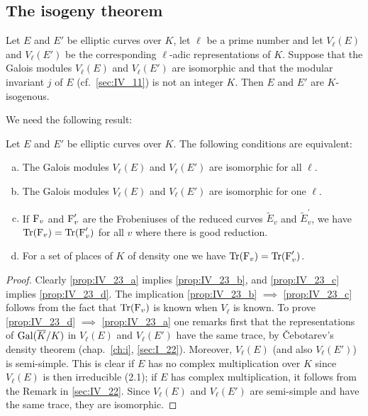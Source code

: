 \subsection{The isogeny theorem}
\label{sec:IV_23}

\begin{thm}
	Let $E$ and $E'$ be elliptic curves over $K$, let $\ell$ be a prime
	number and let $V_\ell(E)$ and $V_\ell(E')$ be the corresponding
	$\ell$-adic representations of $K$. Suppose that the Galois modules
	$V_\ell(E)$ and $V_\ell(E')$ are isomorphic and that the modular
	invariant $j$ of $E$ (cf.~\ref{sec:IV_11}) is not an integer $K$. Then
	$E$ and $E'$ are $K$-isogenous.
\end{thm}

We need the following result:
\dpage
\begin{prop}
	Let $E$ and $E'$ be elliptic curves over $K$. The following conditions
	are equivalent:
	\begin{enumerate}[(a)]
		\item\label{prop:IV_23_a}
			The Galois modules $V_\ell(E)$ and $V_\ell(E')$ are
			isomorphic for all $\ell$.
		\item\label{prop:IV_23_b}
			The Galois modules $V_\ell(E)$ and $V_\ell(E')$ are
			isomorphic for one $\ell$.
		\item\label{prop:IV_23_c}
			If $\operatorname{F}_v$ and $\operatorname{F}^\prime_v$ are the Frobeniuses of
			the reduced curves $\widetilde E_v$ and
			$\widetilde{E}^\prime_v$, we have $\operatorname{Tr}(\operatorname{F}_v) =
			\operatorname{Tr}(\operatorname{F}^\prime_v)$ for all $v$ where there is good
			reduction.
		\item\label{prop:IV_23_d}
			For a set of places of $K$ of density one we have
			$\operatorname{Tr}(\operatorname{F}_v) = \operatorname{Tr}(\operatorname{F}^\prime_v)$.
	\end{enumerate}
\end{prop}
\begin{proof}
	Clearly \ref{prop:IV_23_a} implies \ref{prop:IV_23_b}, and
	\ref{prop:IV_23_c} implies \ref{prop:IV_23_d}. The implication
	\ref{prop:IV_23_b} $\implies$ \ref{prop:IV_23_c} follows from the fact
	that $\operatorname{Tr}(\operatorname{F}_v)$ is known when $V_\ell$ is known. To prove
	\ref{prop:IV_23_d} $\implies$ \ref{prop:IV_23_a} one remarks first that
	the representations of $\operatorname{Gal}(\overline{K}/K)$ in $V_\ell(E)$ and
	$V_\ell(E')$ have the same trace, by \v Cebotarev's density theorem
	(chap.~\ref{ch:i}, \ref{sec:I_22}). Moreover, $V_\ell(E)$ (and also
	$V_\ell(E')$) is semi-simple. This is clear if $E$ has no complex
	multiplication over $K$ since $V_\ell(E)$ is then irreducible (2.1); if
	$E$ has complex multiplication, it follows from the Remark in
	\ref{sec:IV_22}.  Since $V_\ell(E)$ and $V_\ell(E')$ are semi-simple
	and have the same trace, they are isomorphic.
\end{proof}
